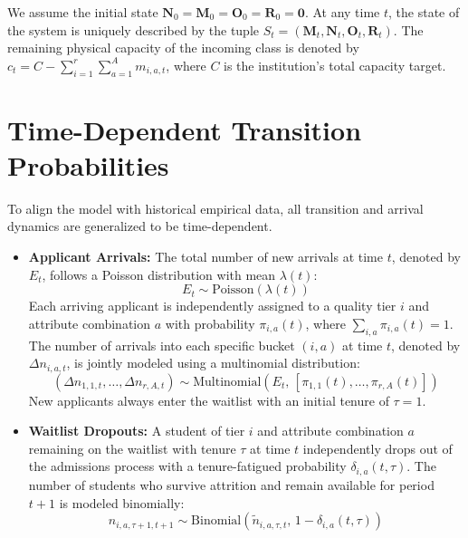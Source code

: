 \documentclass{article}
\newcommand{\Binomial}{\mathrm{Binomial}}
\newcommand{\Poisson}{\mathrm{Poisson}}
\newcommand{\Multinomial}{\mathrm{Multinomial}}
\begin{document}
We assume the initial state $\mathbf{N}_0 = \mathbf{M}_0 = \mathbf{O}_0 = \mathbf{R}_0 = \mathbf{0}$. At any time $t$, the state of the system is uniquely described by the tuple $S_t = (\mathbf{M}_t, \mathbf{N}_t, \mathbf{O}_t, \mathbf{R}_t)$. The remaining physical capacity of the incoming class is denoted by $c_t = C - \sum_{i=1}^r \sum_{a=1}^A m_{i, a, t}$, where $C$ is the institution's total capacity target.

\section{Time-Dependent Transition Probabilities}

To align the model with historical empirical data, all transition and arrival dynamics are generalized to be time-dependent.
\begin{itemize}
    \item \textbf{Applicant Arrivals:} The total number of new arrivals at time $t$, denoted by $E_t$, follows a Poisson distribution with mean $\lambda(t)$:
\[
    E_t \sim \Poisson(\lambda(t))
\]
Each arriving applicant is independently assigned to a quality tier $i$ and attribute combination $a$ with probability $\pi_{i, a}(t)$, where $\sum_{i, a} \pi_{i, a}(t) = 1$. The number of arrivals into each specific bucket $(i, a)$ at time $t$, denoted by $\Delta n_{i, a, t}$, is jointly modeled using a multinomial distribution:
\[
(\Delta n_{1, 1, t}, \dots, \Delta n_{r, A, t}) \sim \Multinomial\left(E_t, \, [\pi_{1, 1}(t), \dots, \pi_{r, A}(t)]\right)
\]
New applicants always enter the waitlist with an initial tenure of $\tau = 1$.

    \item \textbf{Waitlist Dropouts:} A student of tier $i$ and attribute combination $a$ remaining on the waitlist with tenure $\tau$ at time $t$ independently drops out of the admissions process with a tenure-fatigued probability $\delta_{i, a}(t, \tau)$. The number of students who survive attrition and remain available for period $t+1$ is modeled binomially:
\[
    n_{i, a, \tau+1, t+1} \sim \Binomial( \tilde{n}_{i, a, \tau, t}, \, 1 - \delta_{i, a}(t, \tau) )
\]


\end{itemize}
\end{document}
